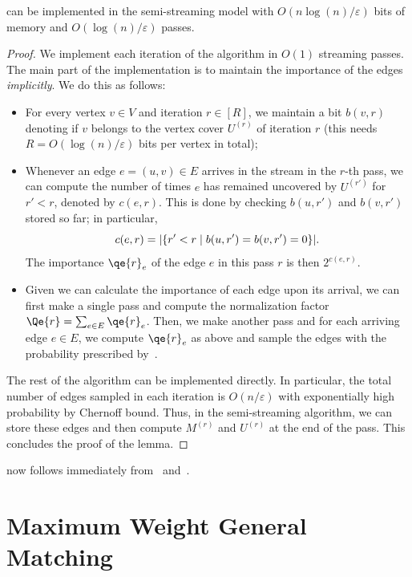\documentclass{theoretics}
\DeclarePairedDelimiter{\card}{\vert}{\vert}
\DeclarePairedDelimiter{\set}{\{}{\}}
\newcommand{\eps}{\varepsilon}
\begin{document}
\begin{lemma}\label{lem:semi-stream-bipartite}
	 can be implemented in the semi-streaming model with $O(n\log{\!(n)}/\eps)$ bits of memory and $O(\log{\!(n)}/\eps)$ passes. 
\end{lemma}
\begin{proof}
	We implement each iteration of the algorithm in $O(1)$ streaming passes. The main part of the  implementation is to maintain the importance of the edges \emph{implicitly}. We do this as follows: 
	\begin{itemize}
	\item For every vertex $v \in V$ and iteration $r \in [R]$, 
	we maintain a  bit $b(v,r)$ denoting if $v$ belongs to the vertex cover $U^{(r)}$ of iteration $r$ (this needs $R = O(\log\!{(n)}/\eps)$ bits per vertex in total);
	\item Whenever an edge $e=(u,v) \in E$ arrives in the stream in the $r$-th pass, we can compute the number of times $e$ has remained uncovered by $U^{(r')}$ for $r' < r$, denoted by $c(e,r)$. This is done by checking $b(u,r')$ and $b(v,r')$ stored
	so far; in particular, 
	\[
	c(e,r) = \card{\set{r' < r \mid b(u,r') = b(v,r') = 0}}.
	\]
	 The importance $\qe{r}_e$ of the edge $e$ in this pass $r$ is then $2^{c(e,r)}$. 
	\item Given we can calculate the importance of each edge upon its arrival, we can first make a single pass and compute the normalization factor $\Qe{r} = \sum_{e \in E} \qe{r}_e$. Then, 
	we make another pass and for each arriving edge $e \in E$, we compute $\qe{r}_e$ as above and sample the edges with the probability prescribed by~. 
	\end{itemize} 
	
	The rest of the algorithm can be implemented directly. In particular, the total number of edges sampled in each iteration is $O(n/\eps)$ with exponentially high probability by Chernoff bound. Thus, in the semi-streaming algorithm, 
	we can store these edges and then compute $M^{(r)}$ and $U^{(r)}$ at the end of the pass. This concludes the proof of the lemma. 
\end{proof}

 now follows immediately from~ and~. 




\section{Maximum Weight General Matching}\label{sec:general}
\end{document}

